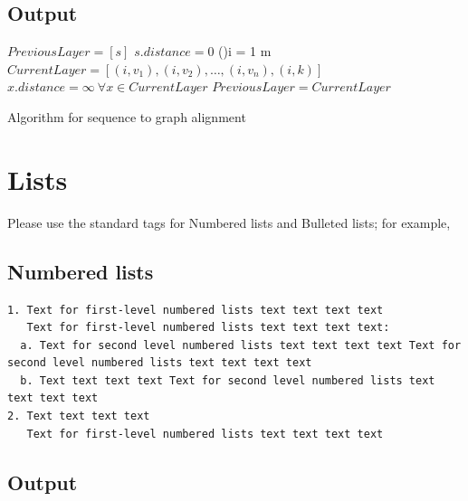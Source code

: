 \documentclass[]{imag-ms-template}
\theoremstyle{plain}
\theoremstyle{remark}
\begin{document}
\subsection*{Output}\label{output-1}

\begin{algorithm}[h!]
\SetAlgoLined
{}
 $PreviousLayer=[s]$\;
 $s.distance = 0$\;
 \For(){i = 1 \KwTo m}{
   $CurrentLayer = [(i,v_1),(i,v_{2}),\ldots, (i,v_{n}), (i,k)]$\;
   $x.distance = \infty \ \forall  x \in CurrentLayer$\;
   \;
   \;
   $PreviousLayer = CurrentLayer$\;
 }
 \;
 \caption{Algorithm for sequence to graph alignment}
 \label{algo:linear}
\end{algorithm}

\section{Lists}\label{lists}

Please use the standard tags for Numbered lists and Bulleted lists; for
example,

\subsection*{Numbered lists}\label{numbered-lists}

\begin{verbatim}
1. Text for first-level numbered lists text text text text
   Text for first-level numbered lists text text text text: 
  a. Text for second level numbered lists text text text text Text for second level numbered lists text text text text 
  b. Text text text text Text for second level numbered lists text text text text 
2. Text text text text
   Text for first-level numbered lists text text text text 
\end{verbatim}

\subsection*{Output}\label{output-2}
\end{document}
